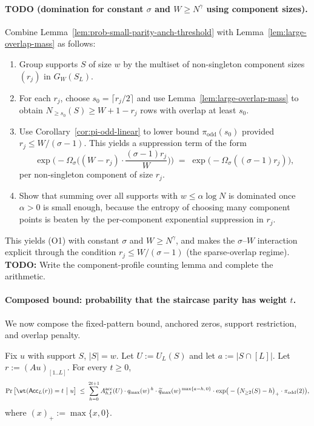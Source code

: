 \paragraph{TODO (domination for constant $\sigma$ and $W\ge N^\gamma$ using component sizes).}
Combine Lemma~\ref{lem:prob-small-parity-anch-threshold} with Lemma~\ref{lem:large-overlap-mass} as follows:
\begin{enumerate}
\item Group supports $S$ of size $w$ by the multiset of non-singleton component sizes $(r_j)$ in $G_W(S_L)$.
\item For each $r_j$, choose $s_0=\lceil r_j/2\rceil$ and use Lemma~\ref{lem:large-overlap-mass} to obtain
      $N_{\ge s_0}(S)\ge W+1-r_j$ rows with overlap at least $s_0$.
\item Use Corollary~\ref{cor:pi-odd-linear} to lower bound $\pi_{\mathrm{odd}}(s_0)$ provided
      $r_j \le W/(\sigma-1)$.
      This yields a suppression term of the form
      \[
      \exp\!\Big(-\Omega_\sigma\Big((W-r_j)\cdot \frac{(\sigma-1)r_j}{W}\Big)\Big)
      \;=\;
      \exp\!\big(-\Omega_\sigma((\sigma-1)r_j)\big),
      \]
      per non-singleton component of size $r_j$.
\item Show that summing over all supports with $w\le \alpha\log N$ is dominated once $\alpha>0$ is small enough,
      because the entropy of choosing many component points is beaten by the per-component exponential suppression
      in $r_j$.
\end{enumerate}
This yields (O1) with constant $\sigma$ and $W\ge N^\gamma$, and makes the $\sigma$--$W$ interaction explicit through the
condition $r_j\le W/(\sigma-1)$ (the sparse-overlap regime).
\noindent\textbf{TODO:} Write the component-profile counting lemma and complete the arithmetic.





\paragraph{Composed bound: probability that the staircase parity has weight $t$.}
We now compose the fixed-pattern bound, anchored zeros, support restriction, and overlap penalty.

\begin{lemma}
\label{lem:prob-small-parity-anch-tight-U}
Fix $u$ with support $S$, $|S|=w$.
Let $U:=U_L(S)$ and let $a:=|S\cap[L]|$.
Let $r:=(Au)_{[1..L]}$.
For every $t\ge 0$,
\[
\Pr\big[\wt({\sf Acc}_{L}(r))=t\ \big|\ u\big]
\;\le\;
\sum_{h=0}^{2t+1}
A^{\mathrm{acc}}_{h,t}(U)\cdot
q_{\max}(w)^{\,h}\cdot
\widetilde q_{\max}(w)^{\,\max\{a-h,\,0\}}\cdot
\exp\!\big(-\big(N_{\ge 2}(S)-h\big)_+\cdot \pi_{\mathrm{odd}}(2)\big),
\]
where $(x)_+:=\max\{x,0\}$.
\end{lemma}

